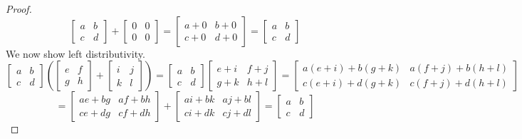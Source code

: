 \begin{proof}
\[\begin{bmatrix}
        a & b \\
        c & d
    \end{bmatrix} + \begin{bmatrix}
        0 & 0 \\
        0 & 0
    \end{bmatrix} = \begin{bmatrix}
        a+0 & b+0 \\
        c+0 & d+0
    \end{bmatrix} = \begin{bmatrix}
        a & b \\
        c & d
    \end{bmatrix}\]
    We now show left distributivity.
    \[
    \begin{bmatrix}
        a & b \\
        c & d
    \end{bmatrix}
    \left(
    \begin{bmatrix}
        e & f \\
        g & h
    \end{bmatrix}
    +
    \begin{bmatrix}
        i & j \\
        k & l
    \end{bmatrix}
    \right)
    =
    \begin{bmatrix}
        a & b \\
        c & d
    \end{bmatrix}
    \begin{bmatrix}
        e+i & f+j \\
        g+k & h+l
    \end{bmatrix}
    =
    \begin{bmatrix}
        a(e+i) + b(g+k) & a(f+j) + b(h+l) \\
        c(e+i) + d(g+k) & c(f+j) + d(h+l)
    \end{bmatrix}
    \]
    \[
    =
    \begin{bmatrix}
        ae + bg & af + bh \\
        ce + dg & cf + dh
    \end{bmatrix}
    +
    \begin{bmatrix}
        ai + bk & aj + bl \\
        ci + dk & cj + dl
    \end{bmatrix}
    =
    \begin{bmatrix}
        a & b \\
        c & d
    \end{bmatrix}
\]
\end{proof}
